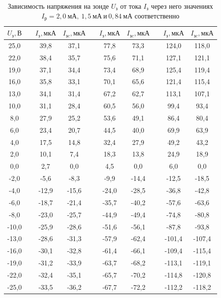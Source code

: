 \documentclass[a4paper,12pt]{article}
\begin{document}
\begin{table}[h]
	\centering
	\caption{Зависимость напряжения на зонде $U_{\text{з}}$ от тока $I_{\text{з}}$ через него значениях $I_{\text{р}}=2,0~\text{мА},\ 1,5~\text{мА}\ \text{и}\ 0,84~\text{мА}$ соответственно} \label{Holl}
	\begin{tabular}{|c|c|c|c|c|c|c|c|c|c|}
		\hline
		$U_{\text{з}},\text{В}$ && $I_{\text{з}},\text{мкА}$ & $I_{\text{з}c},\text{мкА}$ && $I_{\text{з}},\text{мкА}$ & $I_{\text{з}c},\text{мкА}$ && $I_{\text{з}},\text{мкА}$ & $I_{\text{з}c},\text{мкА}$ \\ \hline
		25,0 && 39,8 & 37,1 && 77,8 & 73,3 && 124,0 & 118,0 \\ \hline
		22,0 && 38,4 & 35,7 && 75,6 & 71,1 && 127,1 & 121,1 \\ \hline
		19,0 && 37,1 & 34,4 && 73,4 & 68,9 && 125,4 & 119,4 \\ \hline
		16,0 && 35,8 & 33,1 && 70,1 & 65,6 && 121,4 & 115,4 \\ \hline
		13,0 && 34,1 & 31,4 && 67,2 & 62,7 && 113,1 & 107,1 \\ \hline
		10,0 && 31,1 & 28,4 && 60,5 & 56,0 && 99,4 & 93,4 \\ \hline
		8,0 && 27,9 & 25,2 && 53,6 & 49,1 && 86,4 & 80,4 \\ \hline
		6,0 && 23,4 & 20,7 && 44,5 & 40,0 && 69,9 & 63,9 \\ \hline
		4,0 && 17,5 & 14,8 && 32,4 & 27,9 && 49,2 & 43,2 \\ \hline
		2,0 && 10,1 & 7,4 && 18,3 & 13,8 && 24,9 & 18,9 \\ \hline
		0,0 && 2,7 & 0,0 && 4,5 & 0,0 && 6,0 & 0,0 \\ \hline
		-2,0 && -5,6 & -8,3 && -9,9 & -14,4 && -12,5 & -18,5 \\ \hline
		-4,0 && -12,9 & -15,6 && -24,0 & -28,5 && -36,8 & -42,8 \\ \hline
		-6,0 && -18,7 & -21,4 && -35,7 & -40,2 && -57,6 & -63,6 \\ \hline
		-8,0 && -23,0 & -25,7 && -44,9 & -49,4 && -74,8 & -80,8 \\ \hline
		-10,0 && -25,9 & -28,6 && -51,6 & -56,1 && -87,8 & -93,8 \\ \hline
		-13,0 && -28,6 & -31,3 && -57,9 & -62,4 && -101,4 & -107,4 \\ \hline
		-16,0 && -30,1 & -32,8 && -61,4 & -66,1 && -109,4 & -115,4 \\ \hline
		-19,0 && -31,2 & -33,9 && -63,7 & -68,2 && -113,1 & -119,1 \\ \hline
		-22,0 && -32,4 & -35,1 && -65,7 & -70,2 && -114,8 & -120,8 \\ \hline
		-25,0 && -33,5 & -36,2 && -67,7 & -72,2 && -112,2 & -118,2 \\ \hline
	\end{tabular}
\end{table}
\end{document}
